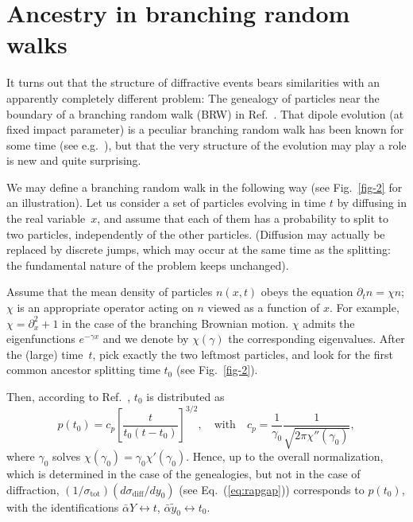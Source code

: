 \documentclass{webofc}
\begin{document}

\section{Ancestry in branching random walks}


It turns out that the structure of diffractive events
bears similarities with an apparently completely different problem: The genealogy of
particles near the boundary of a
branching random walk (BRW) in Ref.~\cite{0295-5075-115-4-40005}.
That dipole evolution (at fixed impact parameter) is a peculiar branching random walk
has been known for some time (see e.g.~\cite{Munier:2014bba}), but that the very structure of the evolution may play
a role is new and quite surprising.

We may define a branching random walk in the following way (see Fig.~\ref{fig-2} for an illustration).
Let us consider a set of particles evolving in time $t$ by diffusing in the real variable~$x$,
and assume that each of them has a probability to split to two particles, independently of
the other particles. (Diffusion may actually be replaced by discrete jumps, which may
occur at the same time as the splitting: the fundamental nature of the problem keeps unchanged).

Assume that the mean density of particles $n(x,t)$ obeys the equation
$\partial_t n=\chi n$; $\chi$ is an appropriate operator acting
on $n$ viewed as a function of $x$. For example, $\chi=\partial_x^2+1$ in the case
of the branching Brownian motion.
$\chi$ admits the eigenfunctions $e^{-\gamma x}$ and we denote by
$\chi(\gamma)$ the corresponding eigenvalues.
After the (large) time~$t$, pick exactly the two leftmost particles,
and look for the first common ancestor splitting time $t_0$ (see Fig.~\ref{fig-2}).

Then, according to Ref.~\cite{0295-5075-115-4-40005},
$t_0$ is distributed as
\begin{equation}
p(t_0)=c_p\left[
  \frac{t}{t_0(t-t_0)}
  \right]^{3/2},
\quad \text{with}\quad c_p=\frac{1}{\gamma_0}\frac{1}{\sqrt{2\pi\chi''(\gamma_0)}},
\label{eq:p}
\end{equation}
where $\gamma_0$ solves $\chi(\gamma_0)=\gamma_0\chi'(\gamma_0)$.
Hence, up to the overall
normalization, which is determined in the case of the genealogies, but
not in the case of diffraction,
$({1}/{\sigma_\text{tot}})({d\sigma_\text{diff}}/{dy_0})$ (see Eq.~(\ref{eq:rapgap}))
corresponds to $p(t_0)$,
with the identifications $\bar\alpha Y\leftrightarrow t$,
$\bar\alpha \tilde y_0\leftrightarrow t_0$.
\end{document}
